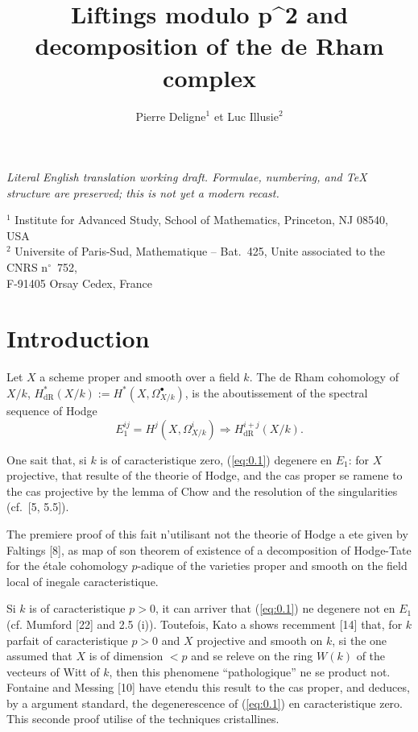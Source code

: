 \documentclass[12pt,a4paper]{article}
\title{Liftings modulo p^2 and decomposition of the de Rham complex}
\author{Pierre Deligne$^1$ et Luc Illusie$^2$}
\date{}
\theoremstyle{plain}
\theoremstyle{definition}
\theoremstyle{remark}
\newcommand{\dR}{\text{dR}}
\begin{document}
\begin{center}\small\emph{Literal English translation working draft. Formulae, numbering, and TeX structure are preserved; this is not yet a modern recast.}\end{center}
\vspace{0.5em}

\maketitle

\begin{center}
$^1$ Institute for Advanced Study, School of Mathematics, Princeton, NJ 08540, USA\\
$^2$ Universite of Paris-Sud, Mathematique -- Bat.~425, Unite associated to the CNRS n$^\circ$~752,\\
F-91405 Orsay Cedex, France
\end{center}

\tableofcontents

\section*{Introduction}

Let $X$ a scheme proper and smooth over a field $k$. The de Rham cohomology of
$X/k$, $H^*_{\dR}(X/k) := H^*(X, \Omega^{\bullet}_{X/k})$, is the aboutissement of the spectral sequence of Hodge
\begin{equation}\label{eq:0.1}
E_1^{ij} = H^j(X, \Omega^i_{X/k}) \Rightarrow H^{i+j}_{\dR}(X/k).
\end{equation}

One sait that, si $k$ is of caracteristique zero, (\ref{eq:0.1}) degenere en $E_1$: for $X$
projective, that resulte of the theorie of Hodge, and the cas proper se ramene to the cas
projective by the lemma of Chow and the resolution of the singularities (cf.~[5, 5.5]).

The premiere proof of this fait n'utilisant not the theorie of Hodge a ete
given by Faltings [8], as map of son theorem of existence of a
decomposition of Hodge-Tate for the étale cohomology $p$-adique of the varieties
proper and smooth on the field local of inegale caracteristique.

Si $k$ is of caracteristique $p > 0$, it can arriver that (\ref{eq:0.1}) ne degenere not en $E_1$ (cf.
Mumford [22] and 2.5 (i)). Toutefois, Kato a shows recemment [14] that, for $k$
parfait of caracteristique $p > 0$ and $X$ projective and smooth on $k$, si the one assumed that $X$ is
of dimension $< p$ and se releve on the ring $W(k)$ of the vecteurs of Witt of $k$, then this
phenomene ``pathologique'' ne se product not. Fontaine and Messing [10] have
etendu this result to the cas proper, and deduces, by a argument standard, the
degenerescence of (\ref{eq:0.1}) en caracteristique zero. This seconde proof
utilise of the techniques cristallines.
\end{document}
